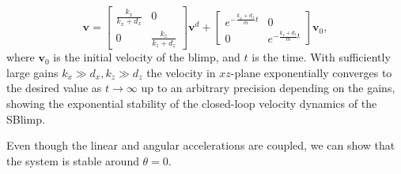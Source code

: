 \documentclass[conference]{ieeeconf}
\begin{document}
\begin{equation}
    \boldsymbol{v} = \begin{bmatrix}
        \frac{k_{\dot x}}{k_{\dot x}+d_{x}} & 0\\
        0 & \frac{k_{\dot z}}{k_{\dot z}+d_{z}}
    \end{bmatrix}\boldsymbol{v}^d + \begin{bmatrix}
        e^{-\frac{k_{\dot x}+d_{x}}{m}t} & 0\\
        0 & e^{-\frac{k_{\dot z}+d_{z}}{m}t}
    \end{bmatrix}\boldsymbol{v}_0,
    \label{eq:velsol}
\end{equation}
where $\boldsymbol{v}_{0}$ is the initial velocity of the blimp, and $t$ is the time. With sufficiently large gains $k_{\dot x}\gg d_{x}, k_{\dot z}\gg d_{z}$ the velocity in $xz$-plane exponentially converges to the desired value as $t\!\rightarrow\!\infty$ up to an arbitrary precision depending on the gains, showing the exponential stability of the closed-loop velocity dynamics of the SBlimp.

Even though the linear and angular accelerations are coupled, we can show that the system is stable around $\theta=0$.
\end{document}
